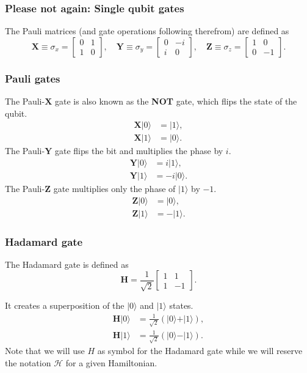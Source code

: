 \documentclass{beamer}
\begin{document}
\begin{frame}
\frametitle{Please not again: Single qubit gates}

The Pauli matrices (and gate operations following therefrom) are defined as
\[
	\bm{X} \equiv \sigma_x = \begin{bmatrix}
		0 & 1 \\
		1 & 0
	\end{bmatrix}, \quad
	\bm{Y} \equiv \sigma_y = \begin{bmatrix}
		0 & -i \\
		i & 0
	\end{bmatrix}, \quad
	\bm{Z} \equiv \sigma_z = \begin{bmatrix}
		1 & 0 \\
		0 & -1
	\end{bmatrix}.
\]
\end{frame}

\begin{frame}
\frametitle{Pauli gates}

The Pauli-$\bm{X}$ gate is also known as the \textbf{NOT} gate, which flips the state of the qubit.
\begin{align*}
	\bm{X}\vert 0\rangle &= \vert 1\rangle, \\
	\bm{X}\vert 1\rangle &= \vert 0\rangle.	
\end{align*}
The Pauli-$\bm{Y}$ gate flips the bit and multiplies the phase by $ i $. 
\begin{align*}
	\bm{Y}\vert 0\rangle &= i\vert 1\rangle, \\
	\bm{Y}\vert 1\rangle &= -i\vert 0\rangle.
\end{align*}
The Pauli-$\bm{Z}$ gate multiplies only the phase of $\vert 1\rangle$ by $ -1 $.
\begin{align*}
	\bm{Z}\vert 0\rangle &= \vert 0\rangle, \\
	\bm{Z}\vert 1\rangle &= -\vert 1\rangle.
\end{align*}
\end{frame}

\begin{frame}
\frametitle{Hadamard gate}

The Hadamard gate is defined as
\[
	\bm{H} = \frac{1}{\sqrt{2}} \begin{bmatrix}
		1 & 1 \\
		1 & -1
	\end{bmatrix}.
\]

It creates a superposition of the $ \vert 0\rangle $ and $ \vert 1\rangle $ states.
\begin{align}
	\bm{H}\vert 0\rangle &= \frac{1}{\sqrt{2}} \left( \vert 0\rangle + \vert 1\rangle \right), \\
	\bm{H}\vert 1\rangle &= \frac{1}{\sqrt{2}} \left( \vert 0\rangle - \vert 1\rangle \right).
\end{align}
Note that we will use $H$ as symbol for the Hadamard gate while we will reserve the notation $\mathcal{H}$ for a given Hamiltonian.
\end{frame}
\end{document}
